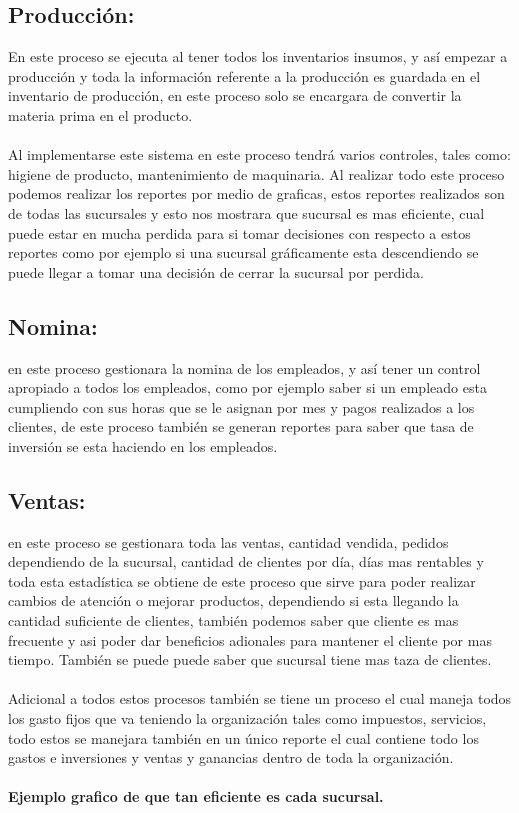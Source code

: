 	\subsection{Producci\'on:}En este proceso se ejecuta al tener todos los inventarios insumos, y así empezar a producci\'on y toda la informaci\'on referente a la producci\'on es guardada en el inventario de producci\'on, en este proceso solo se encargara de convertir la materia prima en el producto.	
\\%
\\%
Al implementarse este sistema en este proceso tendr\'a varios controles, tales como: higiene de producto, mantenimiento de maquinaria. Al realizar todo este proceso podemos realizar los reportes por medio de graficas, estos reportes realizados son de todas las sucursales y esto nos mostrara que sucursal es mas eficiente, cual puede estar en mucha perdida para si tomar decisiones con respecto a estos reportes como por ejemplo si una sucursal gr\'aficamente esta descendiendo se puede llegar a tomar una decisi\'on de cerrar la sucursal por perdida.
\subsection{Nomina:}en este proceso gestionara la nomina de los empleados, y as\'i tener un control apropiado a todos los empleados, como por ejemplo saber si un empleado esta cumpliendo con sus horas que se le asignan por mes y pagos realizados a los clientes, de este proceso tambi\'en se generan reportes para saber que tasa de inversi\'on se esta haciendo en los empleados.
\subsection{Ventas:}en este proceso se gestionara toda las ventas, cantidad vendida, pedidos dependiendo de la sucursal, cantidad de clientes por d\'ia, d\'ias mas rentables y toda esta estad\'istica se obtiene de este proceso que sirve para poder realizar cambios de atenci\'on o mejorar productos, dependiendo si esta llegando la cantidad suficiente de clientes, tambi\'en podemos saber que cliente es mas frecuente y asi poder dar beneficios adionales para mantener el cliente por mas tiempo. Tambi\'en se puede puede saber que sucursal tiene mas taza de clientes.
\\%
\\%
Adicional a todos estos procesos tambi\'en se tiene un proceso el cual maneja todos los gasto fijos que va teniendo la organizaci\'on tales como impuestos, servicios, todo estos se manejara tambi\'en en un \'unico reporte el cual contiene todo los gastos e inversiones y  ventas y ganancias dentro de toda la organizaci\'on.
\\%
\\%
	\textbf{Ejemplo grafico de que tan eficiente es cada sucursal.}
%
\newpage%
